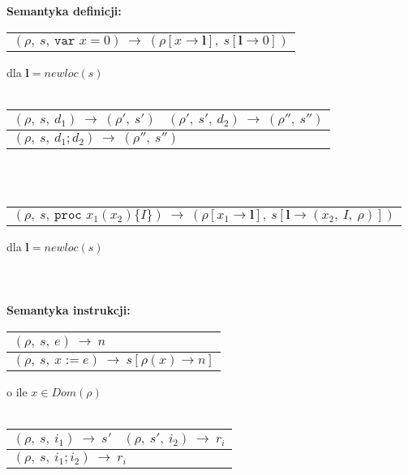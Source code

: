 \documentclass[a4paper,11pt]{article}
\begin{document}
\newpage

{\bf Semantyka definicji:} \\

\begin{tabular}{l}
\\
\hline
  $(\rho,\ s,\ \texttt{var } x = 0)
      \ \longrightarrow\
   (\rho[x \to \mathbf{l}],\ s[\mathbf{l} \to 0])$\\
\end{tabular}
dla $\mathbf{l} = newloc(s)$ \\
\\

\begin{tabular}{l}
  $(\rho,\ s,\ d_1)
      \ \longrightarrow\ 
   (\rho',\ s')
      \ \ \ \ 
   (\rho',\ s',\ d_2)\
      \longrightarrow \
   (\rho'',\ s'')$\\
\hline
  $(\rho,\ s,\ d_1 ; d_2)
      \ \longrightarrow\ 
   (\rho'',\ s'')$\\
\end{tabular} \\ \\


\begin{tabular}{l}
  \\
\hline
  $(\rho,\ s,\ \texttt{proc } x_1(x_2)\{I\})
      \ \longrightarrow\ 
   (\rho[x_1 \to \mathbf{l}],\ s[\mathbf{l} \to (x_2,\ I,\ \rho)])$
\end{tabular} 
dla $\mathbf{l} = newloc(s)$
\\ \\

\ \\ \\

{\bf Semantyka instrukcji:} \\

\begin{tabular}{l}
  $(\rho,\ s,\ e)\
      \longrightarrow\ 
   n$\\
\hline
  $(\rho,\ s,\ x := e)
      \ \longrightarrow\ 
   s[\rho(x) \to n] $ \\
\end{tabular} 
o ile $x \in Dom(\rho)$ 
\\ \\ 

\begin{tabular}{l}
  $(\rho,\ s,\ i_1)
      \ \longrightarrow\ 
   s'
      \ \ \ \ 
   (\rho,\ s',\ i_2)
      \ \longrightarrow\ 
   r_i$\\
\hline
  $(\rho,\ s,\ i_1 ; i_2)
      \ \longrightarrow\ 
   r_i$\\
\end{tabular} \\ \\
\end{document}
